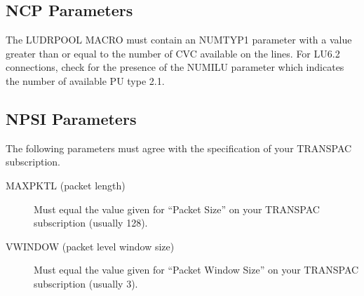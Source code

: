 \documentclass[letterpaper,10pt,english]{sphinxmanual}
\begin{document}

\subsection{NCP Parameters}
\label{\detokenize{connectivity_guide:index-65}}\label{\detokenize{connectivity_guide:ncp-parameters}}
The LUDRPOOL MACRO must contain an NUMTYP1 parameter with a value greater than or equal to the number of CVC available on the lines. For LU6.2 connections, check for the presence of the NUMILU parameter which indicates the number of available PU type 2.1.


\subsection{NPSI Parameters}
\label{\detokenize{connectivity_guide:index-66}}\label{\detokenize{connectivity_guide:npsi-parameters}}
The following parameters must agree with the specification of your TRANSPAC subscription.

\begin{description}
\item[{MAXPKTL (packet length)}] \leavevmode
Must equal the value given for “Packet Size” on your TRANSPAC subscription (usually 128).

\item[{VWINDOW (packet level window size)}] \leavevmode
Must equal the value given for “Packet Window Size” on your TRANSPAC subscription (usually 3).

\end{description}
\end{document}
